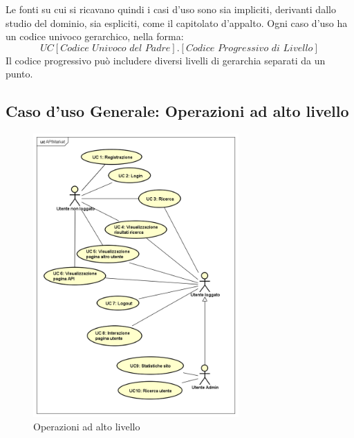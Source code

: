 \documentclass[12pt,a4paper,titlepage]{article}
\begin{document}
Le fonti su cui si ricavano quindi i casi d'uso sono sia impliciti, derivanti dallo studio del dominio, sia espliciti, come il capitolato d'appalto.
Ogni caso d'uso ha un codice univoco gerarchico, nella forma: 
\[UC[\textit{Codice Univoco del Padre}].[\textit{Codice Progressivo di Livello}]\] 
Il codice progressivo può includere diversi livelli di gerarchia separati da un punto.
\clearpage
\subsection{Caso d'uso Generale: Operazioni ad alto livello}
\begin{figure}[ht]
	\centering
	\includegraphics[width=0.7\textwidth]{UseCase/APIMarket}
	\caption{Operazioni ad alto livello}
\end{figure}
\end{document}
